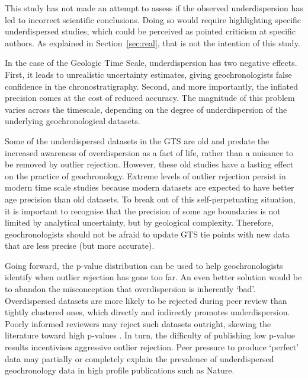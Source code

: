 \documentclass{article}
\begin{document}
This study has not made an attempt to assess if the observed
underdispersion has led to incorrect scientific conclusions. Doing so
would require highlighting specific underdispersed studies, which
could be perceived as pointed criticism at specific authors.  As
explained in Section~\ref{sec:real}, that is not the intention of this
study.\medskip

In the case of the Geologic Time Scale, underdispersion has two
negative effects. First, it leads to unrealistic uncertainty
estimates, giving geochronologists false confidence in the
chronostratigraphy.  Second, and more importantly, the inflated
precision comes at the cost of reduced accuracy. The magnitude of this
problem varies across the timescale, depending on the degree of
underdispersion of the underlying geochronological datasets.\medskip

Some of the underdispersed datasets in the GTS are old and predate the
increased awareness of overdispersion as a fact of life, rather than a
nuisance to be removed by outlier rejection. However, these old
studies have a lasting effect on the practice of geochronology.
Extreme levels of outlier rejection persist in modern time scale
studies because modern datasets are expected to have better age
precision than old datasets. To break out of this self-perpetuating
situation, it is important to recognise that the precision of some age
boundaries is not limited by analytical uncertainty, but by geological
complexity. Therefore, geochronologists should not be afraid to update
GTS tie points with new data that are less precise (but more
accurate).\medskip

Going forward, the p-value distribution can be used to help
geochronologists identify when outlier rejection has gone too far.  An
even better solution would be to abandon the misconception that
overdispersion is inherently `bad'.  Overdispersed datasets are more
likely to be rejected during peer review than tightly clustered ones,
which directly and indirectly promotes underdispersion.  Poorly
informed reviewers may reject such datasets outright, skewing the
literature toward high p-values \citep[publication
  bias,][]{ioannidis2005}.  In turn, the difficulty of publishing low
p-value results incentivises aggressive outlier rejection.  Peer
pressure to produce `perfect' data may partially or completely explain
the prevalence of underdispersed geochronology data in high profile
publications such as Nature.\medskip
\end{document}
